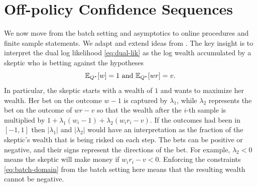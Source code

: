 \section{Off-policy Confidence Sequences}
We now move from the batch setting and asymptotics to online procedures and
finite sample statements.  We adapt and extend ideas from
\cite{waudby-smith_variance-adaptive_2020}.  The key insight is to interpret
the dual log likelihood \eqref{eq:dual-lik} as the log wealth accumulated by a
skeptic who is betting against the hypotheses 
\[
\mathbb{E}_{Q^*}[w]=1 \text{ and } \mathbb{E}_{Q^*}[wr]=v.
\]
In particular, the skeptic starts with a wealth of $1$ and wants to maximize
her wealth. Her bet on the outcome $w-1$ is captured by $\lambda_1$, while
$\lambda_2$ represents the bet on the outcome of $wr-v$ so that the wealth
after the $i$-th sample is multiplied by $1+\lambda_1(w_i-1)+\lambda_2 (w_i r_i
-v)$. If the outcomes had been in $[-1,1]$ then $|\lambda_1|$ and $|\lambda_2|$
would have an interpretation as the fraction of the skeptic's wealth that is
being risked on each step. The bets can be positive or negative, and their
signs represent the directions of the bet. For example, $\lambda_2<0$ means the
skeptic will make money if $w_ir_i-v<0$.  Enforcing the constraints
\eqref{eq:batch-domain} from the batch setting here means that the resulting
wealth cannot be negative.


